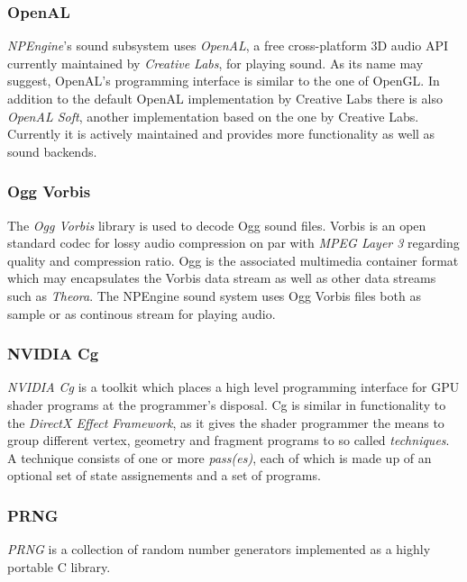 \subsubsection{OpenAL}

\textit{NPEngine}'s sound subsystem uses \textit{OpenAL}, a free
cross-platform 3D audio API currently maintained by \textit{Creative Labs}, for
playing sound. As its name may suggest, OpenAL's programming interface is
similar to the one of OpenGL. In addition to the default OpenAL implementation
by Creative Labs there is also \textit{OpenAL Soft}, another implementation
based on the one by Creative Labs. Currently it is actively maintained and
provides more functionality as well as sound backends. 

\subsubsection{Ogg Vorbis}

The \textit{Ogg Vorbis} library is used to decode Ogg sound files. Vorbis is an
open standard codec for lossy audio compression on par with \textit{MPEG Layer
3} regarding quality and compression ratio. Ogg is the associated
multimedia container format which may encapsulates the Vorbis data stream as
well as other data streams such as \textit{Theora}. The NPEngine sound system
uses Ogg Vorbis files both as sample or as continous stream for playing audio.

\subsubsection{NVIDIA Cg}

\textit{NVIDIA Cg}\cite{misc:nvcg} is a toolkit which places a high
level programming interface for GPU shader programs at the programmer's
disposal. Cg is similar in functionality to the \textit{DirectX Effect
Framework}\cite{misc:directx}\cite{book:effect-hlsl}, as it gives the
shader programmer the means to group different vertex, geometry and fragment
programs to so called \textit{techniques}. A technique consists of one or more
\textit{pass(es)}, each of which is made up of an optional set of state
assignements and a set of programs.

\subsubsection{PRNG}

\textit{PRNG}\cite{misc:prng} is a collection of random number generators
implemented as a highly portable C library.


